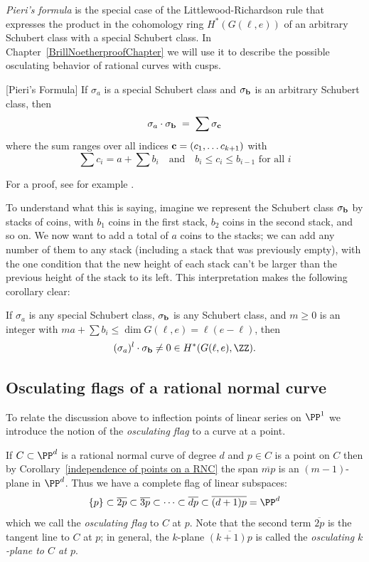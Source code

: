 \emph{Pieri's formula} is the special
case of the Littlewood-Richardson rule that expresses the product in the cohomology ring $H^*(G(\ell, e))$ of an arbitrary Schubert class with a special Schubert class.
In Chapter~\ref{BrillNoetherproofChapter} we will use it to describe the possible osculating behavior of rational curves with cusps.

\begin{fact}
\begin{proposition}\label{Pieri}[Pieri's Formula]
If $\sigma_a$ is a special Schubert class and $\sigma_{\bf b}$ is an arbitrary Schubert class, then
$$
\sigma_a \cdot \sigma_{\bf b} \; = \; \sum \sigma_{\bf c}
$$
where the sum ranges over all indices ${\bf c} = (c_1, \dots c_{k+1})$ with
$$
\sum c_i = a + \sum b_i \quad \text{and} \quad b_i \leq c_i \leq b_{i-1} \text{ for all } i
$$
\end{proposition}

For a proof, see for example \cite[Section 4.2.4]{3264}.
\end{fact}
To understand what this is saying, imagine we represent the Schubert class $\sigma_{\bf b}$ by stacks of coins, with $b_1$ coins in the first stack, $b_2$ coins in the second stack, and so on. We now want to add a total of $a$ coins to the stacks; we can add any number of them to any stack (including a stack that was previously empty), with the one condition that the new height of each stack can't be larger than the previous height of the stack to its left. This interpretation makes the following corollary clear:

\begin{corollary}\label{intersection with sigma nonzero}
If $\sigma_a$ is any special Schubert class, $\sigma_{\bf b}$ is any Schubert class,
and $m\geq 0$ is an integer with $m a + \sum b_i \leq \dim G(\ell, e) = \ell(e-\ell)$, then   
$$
(\sigma_a)^l \cdot \sigma_{\bf b} \neq 0 \in H^*(G(\ell, e), \ZZ).
$$
\end{corollary}

\subsection{Osculating flags of a rational normal curve}

To relate the discussion above to inflection points of linear series on $\PP^1$ we introduce the notion of the \emph{osculating flag} to a curve at a point.

If $C\subset \PP^d$ is a rational normal curve of degree $d$ and $p \in C$ is a point on $C$ then by Corollary~\ref{independence of points on a RNC} the span $\overline{mp}$ is an $(m-1)$-plane in $\PP^d$.
Thus we have a complete flag of linear subspaces:
$$
\{p\} \subset \overline{2p} \subset \overline{3p} \subset \dots \subset \overline{dp} \subset \overline{(d+1)p} = \PP^d
$$
which we call the \emph{osculating flag} to $C$ at $p$. Note that the second term $\overline{2p}$ is the tangent line to $C$ at $p$; in general, the $k$-plane $\overline{(k+1)p}$ is called the \emph{osculating $k$-plane to $C$ at $p$}.

